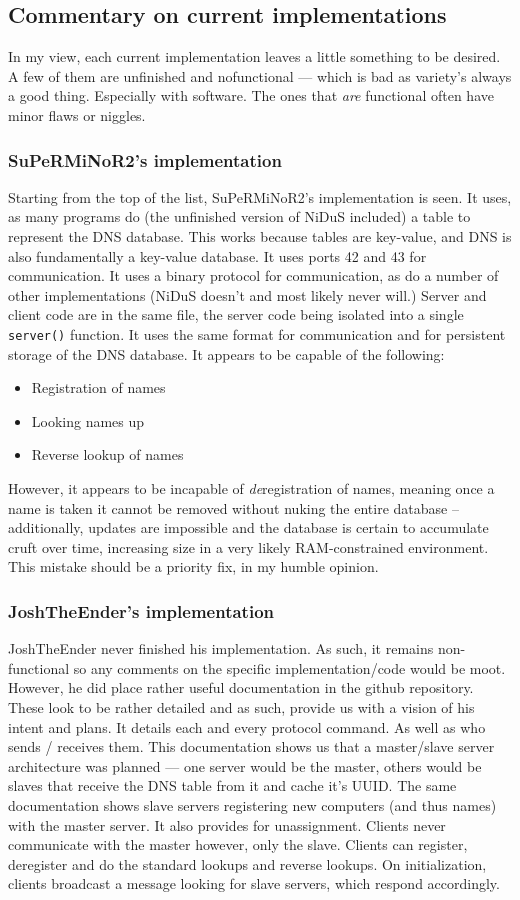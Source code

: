 \documentclass[]{report}
\begin{document}
\subsection{Commentary on current implementations}
In my view, each current implementation leaves a little something to be desired.  A few of them are unfinished and nofunctional --- which is bad as variety's always a good thing. Especially with software. The ones that \emph{are} functional often have minor flaws or niggles. \subsubsection{SuPeRMiNoR2's implementation}
Starting from the top of the list, SuPeRMiNoR2's implementation is seen. It uses, as many programs do (the unfinished version of NiDuS included) a table to represent the DNS database. This works because tables are key-value, and DNS is also fundamentally a key-value database. It uses ports 42 and 43 for communication. It uses a binary protocol for communication, as do a number of other implementations (NiDuS doesn't and most likely never will.) Server and client code are in the same file, the server code being isolated into a single \texttt{server()} function. It uses the same format for communication and for persistent storage of the DNS database. It appears to be capable of the following:
\begin{itemize}
	\item Registration of names
	\item Looking names up
	\item Reverse lookup of names
\end{itemize}
However, it appears to be incapable of \emph{de}registration of names, meaning once a name is taken it cannot be removed without nuking the entire database -- additionally, updates are impossible and the database is certain to accumulate cruft over time, increasing size in a very likely RAM-constrained environment. This mistake should be a priority fix, in my humble opinion.
\subsubsection{JoshTheEnder's implementation}
JoshTheEnder never finished his implementation. As such, it remains non-functional so any comments on the specific implementation/code would be moot. However, he did place rather useful documentation in the github repository. These look to be rather detailed and as such, provide us with a vision of his intent and plans. It details each and every protocol command. As well as who sends / receives them. This documentation shows us that a master/slave server architecture was planned --- one server would be the master, others would be slaves that receive the DNS table from it and cache it's UUID. The same documentation shows slave servers registering new computers (and thus names) with the master server. It also provides for unassignment. Clients never communicate with the master however, only the slave. Clients can register, deregister and do the standard lookups and reverse lookups. On initialization, clients broadcast a message looking for slave servers, which respond accordingly.
\end{document}
